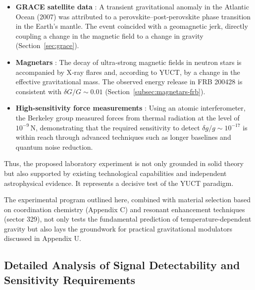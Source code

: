 \documentclass[12pt]{article}
\theoremstyle{remark}
\begin{document}
	\begin{itemize}
		\item \textbf{GRACE satellite data} \cite{Rosat2025}: A transient gravitational anomaly in the Atlantic Ocean (2007) was attributed to a perovskite–post‑perovskite phase transition in the Earth’s mantle. The event coincided with a geomagnetic jerk, directly coupling a change in the magnetic field to a change in gravity (Section~\ref{sec:grace}).
		\item \textbf{Magnetars} \cite{Kaspi2017}: The decay of ultra‑strong magnetic fields in neutron stars is accompanied by X‑ray flares and, according to YUCT, by a change in the effective gravitational mass. The observed energy release in FRB 200428 is consistent with \(\delta G/G \sim 0.01\) (Section~\ref{subsec:magnetars-frb}).
		\item \textbf{High‑sensitivity force measurements} \cite{Muller2017}: Using an atomic interferometer, the Berkeley group measured forces from thermal radiation at the level of \(10^{-9}\,\mathrm{N}\), demonstrating that the required sensitivity to detect \(\delta g/g \sim 10^{-17}\) is within reach through advanced techniques such as longer baselines and quantum noise reduction.
	\end{itemize}
	
	Thus, the proposed laboratory experiment is not only grounded in solid theory but also supported by existing technological capabilities and independent astrophysical evidence. It represents a decisive test of the YUCT paradigm.
	
	The experimental program outlined here, combined with material selection based on coordination chemistry (Appendix C) and resonant enhancement techniques (sector 329), not only tests the fundamental prediction of temperature-dependent gravity but also lays the groundwork for practical gravitational modulators discussed in Appendix U.
	
	\subsection{Detailed Analysis of Signal Detectability and Sensitivity Requirements}
	\label{subsec:signal-detectability}
	
\end{document}
